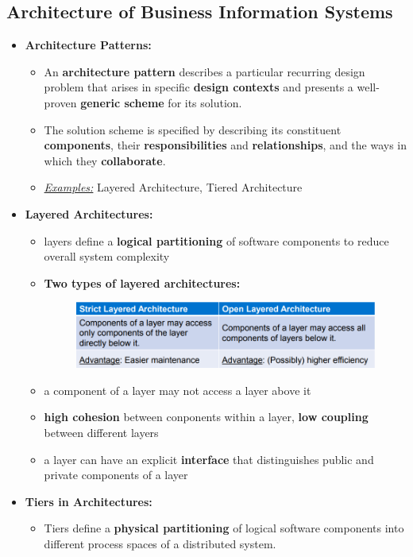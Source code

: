 \documentclass[ieeetran]{article}
\begin{document}
\subsection{Architecture of Business Information Systems} %
\label{sub:architecture_of_business_information_systems}

\begin{itemize}
	\item \textbf{Architecture Patterns:}
		\begin{itemize}
			\item An \textbf{architecture pattern} describes a particular recurring design problem that arises in specific \textbf{design contexts} and presents a well-proven \textbf{generic scheme} for its solution.
			\item The solution scheme is specified by describing its constituent \textbf{components}, their \textbf{responsibilities} and \textbf{relationships}, and the ways in which they \textbf{collaborate}.
			\item \underline{\textit{Examples:}} Layered Architecture, Tiered Architecture
		\end{itemize}

\item \textbf{Layered Architectures:}
	\begin{itemize}
	  \item layers define a \textbf{logical partitioning} of software components to reduce overall system complexity
	\item \textbf{Two types of layered architectures:}
\begin{figure}[h!]
  \centering
  \includegraphics[width=0.6\linewidth]{layeredarchitectures.png}
  \label{fig:layeredarchitectures_png}
\end{figure}
\item a component of a layer may not access a layer above it
\item \textbf{high cohesion} between conponents within a layer, \textbf{low coupling} between different layers
\item a layer can have an explicit \textbf{interface} that distinguishes public and private components of a layer
	\end{itemize}

\item \textbf{Tiers in Architectures:}
	\begin{itemize}
	  \item Tiers define a \textbf{physical partitioning} of logical software components into different process spaces of a distributed system.


\end{itemize}
\end{itemize}
\end{document}
